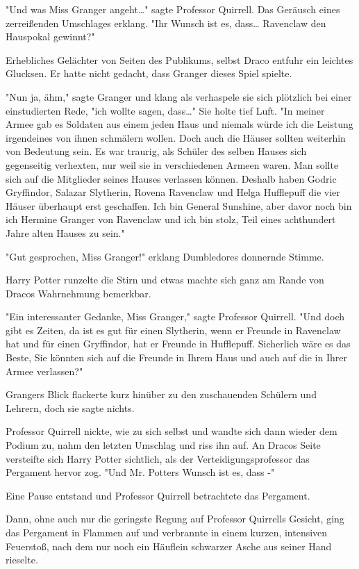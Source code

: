 {"Und was Miss Granger angeht…" sagte Professor Quirrell. Das Geräusch eines zerreißenden Umschlages erklang. "Ihr Wunsch ist es, dass… Ravenclaw den Hauspokal gewinnt?"

Erhebliches Gelächter von Seiten des Publikums, selbst Draco entfuhr ein leichtes Glucksen. Er hatte nicht gedacht, dass Granger dieses Spiel spielte.

"Nun ja, ähm," sagte Granger und klang als verhaspele sie sich plötzlich bei einer einstudierten Rede, "ich wollte sagen, dass…" Sie holte tief Luft. "In meiner Armee gab es Soldaten aus einem jeden Haus und niemals würde ich die Leistung irgendeines von ihnen schmälern wollen. Doch auch die Häuser sollten weiterhin von Bedeutung sein. Es war traurig, als Schüler des selben Hauses sich gegenseitig verhexten, nur weil sie in verschiedenen Armeen waren. Man sollte sich auf die Mitglieder seines Hauses verlassen können. Deshalb haben Godric Gryffindor, Salazar Slytherin, Rovena Ravenclaw und Helga Hufflepuff die vier Häuser überhaupt erst geschaffen. Ich bin General Sunshine, aber davor noch bin ich Hermine Granger von Ravenclaw und ich bin stolz, Teil eines achthundert Jahre alten Hauses zu sein."

"Gut gesprochen, Miss Granger!" erklang Dumbledores donnernde Stimme.

Harry Potter runzelte die Stirn und etwas machte sich ganz am Rande von Dracos Wahrnehmung bemerkbar.

"Ein interessanter Gedanke, Miss Granger," sagte Professor Quirrell. "Und doch gibt es Zeiten, da ist es gut für einen Slytherin, wenn er Freunde in Ravenclaw hat und für einen Gryffindor, hat er Freunde in Hufflepuff. Sicherlich wäre es das Beste, Sie könnten sich auf die Freunde in Ihrem Haus und auch auf die in Ihrer Armee verlassen?"

Grangers Blick flackerte kurz hinüber zu den zuschauenden Schülern und Lehrern, doch sie sagte nichts.

Professor Quirrell nickte, wie zu sich selbst und wandte sich dann wieder dem Podium zu, nahm den letzten Umschlag und riss ihn auf. An Dracos Seite versteifte sich Harry Potter sichtlich, als der Verteidigungsprofessor das Pergament hervor zog. "Und Mr. Potters Wunsch ist es, dass -"

Eine Pause entstand und Professor Quirrell betrachtete das Pergament.

Dann, ohne auch nur die geringste Regung auf Professor Quirrells Gesicht, ging das Pergament in Flammen auf und verbrannte in einem kurzen, intensiven Feuerstoß, nach dem nur noch ein Häuflein schwarzer Asche aus seiner Hand rieselte.

}
